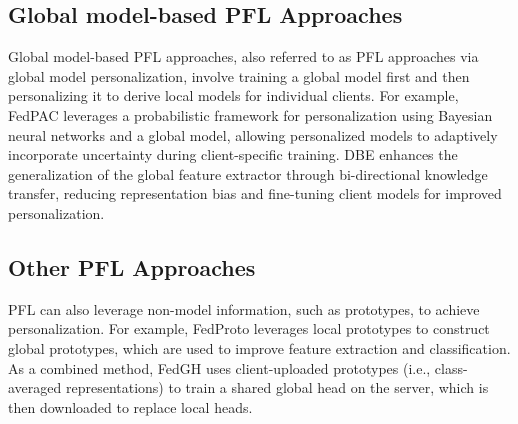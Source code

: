 \subsection{ Global model-based PFL Approaches}
Global model-based PFL approaches, also referred to as PFL approaches via global model personalization, involve training a global model first and then personalizing it to derive local models for individual clients. For example, 
FedPAC \cite{xu2023personalized} leverages a probabilistic framework for personalization using Bayesian neural networks and a global model, allowing personalized models to adaptively incorporate uncertainty during client-specific training. DBE \cite{NEURIPS2023_2e0d3c6a} enhances the generalization of the global feature extractor through bi-directional knowledge transfer, reducing representation bias and fine-tuning client models for improved personalization.



\subsection{Other PFL Approaches}
PFL can also leverage non-model information, such as prototypes, to achieve personalization. For example, FedProto \cite{Tan_Long_LIU_Zhou_Lu_Jiang_Zhang_2022} leverages local prototypes to construct global prototypes, which are used to improve feature extraction and classification. As a combined method, FedGH\cite{10.1145/3581783.3611781} uses client-uploaded prototypes (i.e., class-averaged representations) to train a shared global head on the server, which is then downloaded to replace local heads.

